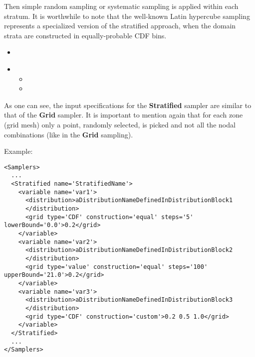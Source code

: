 Then simple random sampling or systematic sampling is applied within each
stratum.
%
It is worthwhile to note that the well-known Latin hypercube sampling represents
a specialized version of the stratified approach, when the domain strata are
constructed in equally-probable CDF bins.

%
\attrIntro
\begin{itemize}
\itemsep0em
\item \nameDescription
\end{itemize}
\begin{itemize}
\item \variableDescription
 \variableChildrenIntro
 \begin{itemize}
    \item \distributionDescription
    \item \gridDescription
  \end{itemize}
\end{itemize}

As one can see, the input specifications for the \textbf{Stratified} sampler are
similar to that of the \textbf{Grid} sampler.
%
It is important to mention again that for each zone (grid mesh) only a point,
randomly selected, is picked and not all the nodal combinations (like in the
\textbf{Grid} sampling).

Example:
\begin{lstlisting}[style=XML,morekeywords={construction,steps,lowerBound,upperBound}]
<Samplers>
  ...
  <Stratified name='StratifiedName'> 
    <variable name='var1'> 
      <distribution>aDistributionNameDefinedInDistributionBlock1
      </distribution> 
      <grid type='CDF' construction='equal' steps='5' lowerBound='0.0'>0.2</grid> 
    </variable>
    <variable name='var2'> 
      <distribution>aDistributionNameDefinedInDistributionBlock2
      </distribution> 
      <grid type='value' construction='equal' steps='100' upperBound='21.0'>0.2</grid> 
    </variable> 
    <variable name='var3'> 
      <distribution>aDistributionNameDefinedInDistributionBlock3
      </distribution> 
      <grid type='CDF' construction='custom'>0.2 0.5 1.0</grid> 
    </variable>
  </Stratified>
  ...
</Samplers>
\end{lstlisting}

